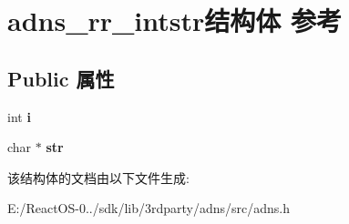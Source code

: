 \hypertarget{structadns__rr__intstr}{}\section{adns\+\_\+rr\+\_\+intstr结构体 参考}
\label{structadns__rr__intstr}
\subsection*{Public 属性}
\begin{DoxyCompactItemize}
\item 
\mbox{\label{structadns__rr__intstr_ad7b1b504d30cf585863410da62e6cac0}} 
int {\bfseries i}
\item 
\mbox{\label{structadns__rr__intstr_a0b8cb90cec5755aecd7b9e71cf9da169}} 
char $\ast$ {\bfseries str}
\end{DoxyCompactItemize}


该结构体的文档由以下文件生成\+:\begin{DoxyCompactItemize}
\item 
E\+:/\+React\+O\+S-\/0../sdk/lib/3rdparty/adns/src/adns.\+h\end{DoxyCompactItemize}
